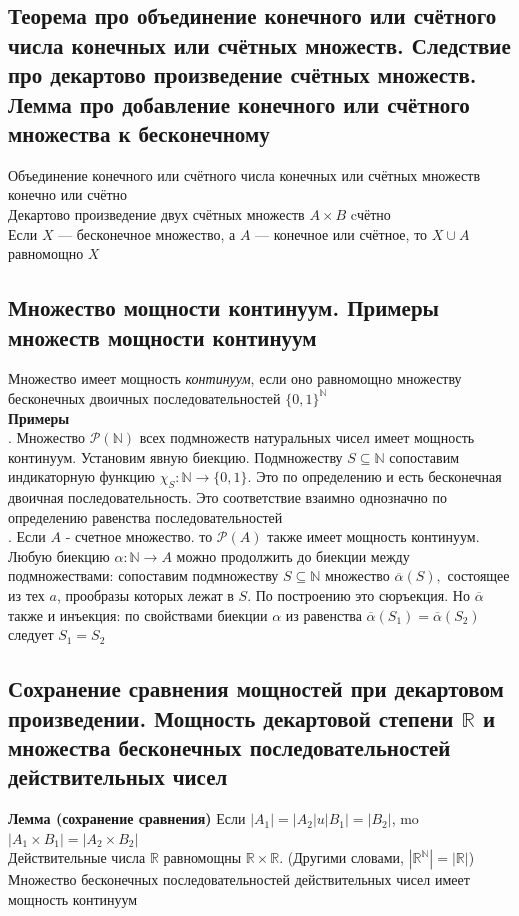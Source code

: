 \documentclass[a4paper]{article}
\begin{document}
\subsection{Теорема про объединение конечного или счётного числа конечных или счётных множеств. Следствие про декартово произведение счётных множеств. Лемма про добавление конечного или счётного множества к бесконечному}
Объединение конечного или счётного числа конечных или счётных множеств конечно или счётно\\[2mm]
Декартово произведение двух счётных множеств $A\times B$ cчётно\\[2mm]
Если $X$ — бесконечное множество, а $A$ — конечное или счётное, то $X\cup A$ равномощно $X$
\subsection{Множество мощности континуум. Примеры множеств мощности континуум}
\label{sec:1.52}Множество имеет мощность \textit{континуум}, если оно равномощно множеству бесконечных двоичных последовательностей $\{0,1\}^{\mathbb{N}}$\\[2mm]
\textbf{Примеры}\\[2mm]
. Множество $\mathcal{P}(\mathbb{N})$ всех подмножеств натуральных чисел имеет мощность континуум. Установим явную биекцию. Подмножеству $S\subseteq \mathbb{N}$ сопоставим индикаторную функцию $\chi_S: \mathbb{N}\rightarrow\{0,1\}$. Это по определению и есть бесконечная двоичная последовательность. Это соответствие взаимно однозначно по определению равенства последовательностей\\[2mm]
. Если $A$ - счетное множество. то $\mathcal{P}(A)$ также имеет мощность континуум. Любую биекцию $\alpha: \mathbb{N}\rightarrow A$ можно продолжить до биекции между подмножествами: сопоставим подмножеству $S\subseteq\mathbb{N}$ множество $\overline{\alpha}(S),$ состоящее из тех $a$, прообразы которых лежат в $S$. По построению это сюръекция. Но $\overline{\alpha}$ также и инъекция: по свойствами биекции $\alpha$ из равенства $\overline{\alpha}(S_1)=\overline{\alpha}(S_2)$ следует $S_1=S_2$
\subsection{Сохранение сравнения мощностей при декартовом произведении. Мощность декартовой
степени $\mathbb{R}$ и множества бесконечных последовательностей действительных чисел}
\textbf{Лемма (сохранение сравнения)} Если $\left|A_{1}\right|=\left|A_{2}\right| u\left|B_{1}\right|=\left|B_{2}\right|$, mo $\left|A_{1} \times B_{1}\right|=\left|A_{2} \times B_{2}\right|$\\[2mm]
Действительные числа $\mathbb{R}$ равномощны $\mathbb{R} \times \mathbb{R}$. (Другими словами, $|\mathbb{R}^{\mathbb{N}}|=|\mathbb{R}|$)\\[2mm]
Множество бесконечных последовательностей действительных чисел имеет мощность континуум
\end{document}
